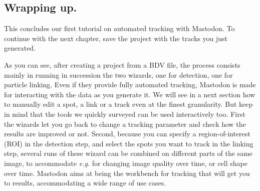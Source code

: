 \subsection{Wrapping up.} 

This concludes our first tutorial on automated tracking with Mastodon.
To continue with the next chapter, save the project with the tracks you just generated.

As you can see, after creating a project from a BDV file, the process consists mainly in running in succession the two wizards, one for detection, one for particle linking. 
Even if they provide fully automated tracking, Mastodon is made for interacting with the data as you generate it. 
We will see in a next section how to manually edit a spot, a link or a track even at the finest granularity.
But keep in mind that the tools we quickly surveyed can be used interactively too. 
First the wizards let you go back to change a tracking parameter and check how the results are improved or not. 
Second, because you can specify a region-of-interest (ROI) in the detection step, and select the spots you want to track in the linking step, several runs of these wizard can be combined on different parts of the same image, to accommodate \textit{e.g.} for changing image quality over time, or cell shape over time. 
Mastodon aims at being the workbench for tracking that will get you to results, accommodating a wide range of use cases.
